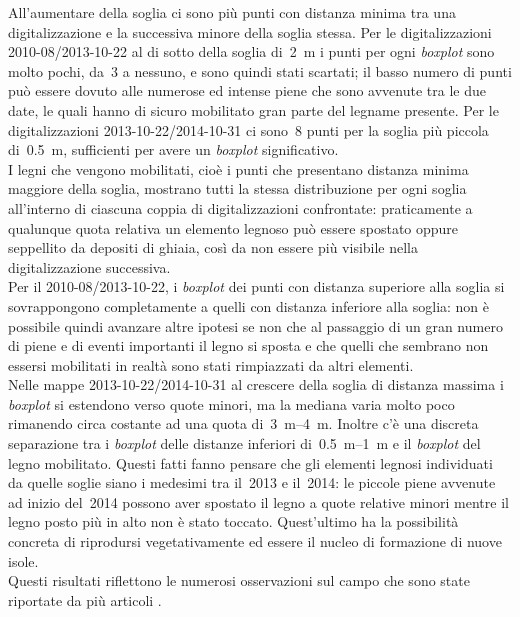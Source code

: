 All'aumentare della soglia ci sono più punti con distanza minima tra una digitalizzazione e la successiva minore della soglia stessa.
Per le digitalizzazioni 2010-08/2013-10-22 al di sotto della soglia di~\SI{2}{\m} i punti per ogni \emph{boxplot} sono molto pochi, da~3 a nessuno, e sono quindi stati scartati; il basso numero di punti può essere dovuto alle numerose ed intense piene che sono avvenute tra le due date, le quali hanno di sicuro mobilitato gran parte del legname presente.
Per le digitalizzazioni 2013-10-22/2014-10-31 ci sono~8 punti per la soglia più piccola di~\SI{0.5}{\m}, sufficienti per avere un \emph{boxplot} significativo.
\\
I legni che vengono mobilitati, cioè i punti che presentano distanza minima maggiore della soglia, mostrano tutti la stessa distribuzione per ogni soglia all'interno di ciascuna coppia di digitalizzazioni confrontate: praticamente a qualunque quota relativa un elemento legnoso può essere spostato oppure seppellito da depositi di ghiaia, così da non essere più visibile nella digitalizzazione successiva.
\\
Per il 2010-08/2013-10-22, i \emph{boxplot} dei punti con distanza superiore alla soglia si sovrappongono completamente a quelli con distanza inferiore alla soglia: non è possibile quindi avanzare altre ipotesi se non che al passaggio di un gran numero di piene e di eventi importanti il legno si sposta e che quelli che sembrano non essersi mobilitati in realtà sono stati rimpiazzati da altri elementi.
\\
Nelle mappe 2013-10-22/2014-10-31 al crescere della soglia di distanza massima i \emph{boxplot} si estendono verso quote minori, ma la mediana varia molto poco rimanendo circa costante ad una quota di~\SIrange[range-phrase = {-}, range-units = single]{3}{4}{\m}.
Inoltre c'è una discreta separazione tra i \emph{boxplot} delle distanze inferiori di~\SIrange[range-phrase = { e }]{0.5}{1}{\m} e il \emph{boxplot} del legno mobilitato.
Questi fatti fanno pensare che gli elementi legnosi individuati da quelle soglie siano i medesimi tra il~2013 e il~2014: le piccole piene avvenute ad inizio del~2014 possono aver spostato il legno a quote relative minori mentre il legno posto più in alto non è stato toccato.
Quest'ultimo ha la possibilità concreta di riprodursi vegetativamente ed essere il nucleo di formazione di nuove isole.
\\
Questi risultati riflettono le numerosi osservazioni sul campo che sono state riportate da più articoli .

